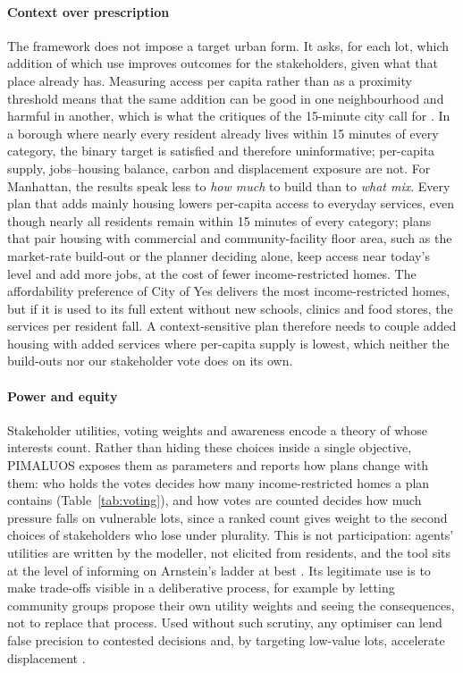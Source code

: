 \documentclass[preprint,12pt]{elsarticle}
\begin{document}
\paragraph{Context over prescription} The framework does not impose a target urban form. It asks, for each lot, which addition of which use improves outcomes for the stakeholders, given what that place already has. Measuring access per capita rather than as a proximity threshold means that the same addition can be good in one neighbourhood and harmful in another, which is what the critiques of the 15-minute city call for \cite{mouratidis2024time,mahmoudpour2026critical}. In a borough where nearly every resident already lives within 15 minutes of every category, the binary target is satisfied and therefore uninformative; per-capita supply, jobs--housing balance, carbon and displacement exposure are not.
For Manhattan, the results speak less to \emph{how much} to build than to \emph{what mix}. Every plan that adds mainly housing lowers per-capita access to everyday services, even though nearly all residents remain within 15 minutes of every category; plans that pair housing with commercial and community-facility floor area, such as the market-rate build-out or the planner deciding alone, keep access near today's level and add more jobs, at the cost of fewer income-restricted homes. The affordability preference of City of Yes delivers the most income-restricted homes, but if it is used to its full extent without new schools, clinics and food stores, the services per resident fall. A context-sensitive plan therefore needs to couple added housing with added services where per-capita supply is lowest, which neither the build-outs nor our stakeholder vote does on its own.

\paragraph{Power and equity} Stakeholder utilities, voting weights and awareness encode a theory of whose interests count. Rather than hiding these choices inside a single objective, PIMALUOS exposes them as parameters and reports how plans change with them: who holds the votes decides how many income-restricted homes a plan contains (Table~\ref{tab:voting}), and how votes are counted decides how much pressure falls on vulnerable lots, since a ranked count gives weight to the second choices of stakeholders who lose under plurality. This is not participation: agents' utilities are written by the modeller, not elicited from residents, and the tool sits at the level of informing on Arnstein's ladder at best \cite{arnstein1969ladder}. Its legitimate use is to make trade-offs visible in a deliberative process, for example by letting community groups propose their own utility weights and seeing the consequences, not to replace that process. Used without such scrutiny, any optimiser can lend false precision to contested decisions and, by targeting low-value lots, accelerate displacement \cite{harvey2008right,fainstein2010just}.
\end{document}
